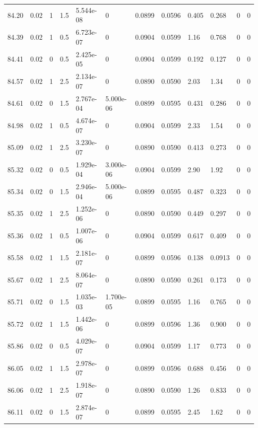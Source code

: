 \documentclass[preview]{standalone}
\begin{document}
{{{{{{{{{{{{{{{{{\begin{tabular}{L{1.2cm}C{1.2cm} C{0.3cm}C{0.5cm} C{1.4cm}C{1.4cm} C{1.4cm}C{1.4cm} C{1.6cm}C{1.6cm} C{1.6cm}C{1.6cm}}
  84.20  &  0.02  & 1     & 1.5 &  5.544e-08  & 0  &  0.0899&   0.0596& 0.405 & 0.268   &  0 & 0  \\ 
  84.39  &  0.02  & 1     & 0.5 &  6.723e-07  & 0  &  0.0904&   0.0599& 1.16 & 0.768   &  0 & 0  \\ 
  84.41  &  0.02  & 0     & 0.5 &  2.425e-05  & 0  &  0.0904&   0.0599& 0.192 & 0.127   &  0 & 0  \\ 
  84.57  &  0.02  & 1     & 2.5 &  2.134e-07  & 0  &  0.0890&   0.0590& 2.03 & 1.34   &  0 & 0  \\ 
  84.61  &  0.02  & 0     & 1.5 &  2.767e-04  & 5.000e-06  &  0.0899&   0.0595& 0.431 & 0.286   &  0 & 0  \\ 
  84.98  &  0.02  & 1     & 0.5 &  4.674e-07  & 0  &  0.0904&   0.0599& 2.33 & 1.54   &  0 & 0  \\ 
  85.09  &  0.02  & 1     & 2.5 &  3.230e-07  & 0  &  0.0890&   0.0590& 0.413 & 0.273   &  0 & 0  \\ 
  85.32  &  0.02  & 0     & 0.5 &  1.929e-04  & 3.000e-06  &  0.0904&   0.0599& 2.90 & 1.92   &  0 & 0  \\ 
  85.34  &  0.02  & 0     & 1.5 &  2.946e-04  & 5.000e-06  &  0.0899&   0.0595& 0.487 & 0.323   &  0 & 0  \\ 
  85.35  &  0.02  & 1     & 2.5 &  1.252e-06  & 0  &  0.0890&   0.0590& 0.449 & 0.297   &  0 & 0  \\ 
  85.36  &  0.02  & 1     & 0.5 &  1.007e-06  & 0  &  0.0904&   0.0599& 0.617 & 0.409   &  0 & 0  \\ 
  85.58  &  0.02  & 1     & 1.5 &  2.181e-07  & 0  &  0.0899&   0.0596& 0.138 & 0.0913   &  0 & 0  \\ 
  85.67  &  0.02  & 1     & 2.5 &  8.064e-07  & 0  &  0.0890&   0.0590& 0.261 & 0.173   &  0 & 0  \\ 
  85.71  &  0.02  & 0     & 1.5 &  1.035e-03  & 1.700e-05  &  0.0899&   0.0595& 1.16 & 0.765   &  0 & 0  \\ 
  85.72  &  0.02  & 1     & 1.5 &  1.442e-06  & 0  &  0.0899&   0.0596& 1.36 & 0.900   &  0 & 0  \\ 
  85.86  &  0.02  & 0     & 0.5 &  4.029e-07  & 0  &  0.0904&   0.0599& 1.17 & 0.773   &  0 & 0  \\ 
  86.05  &  0.02  & 1     & 1.5 &  2.978e-07  & 0  &  0.0899&   0.0596& 0.688 & 0.456   &  0 & 0  \\ 
  86.06  &  0.02  & 1     & 2.5 &  1.918e-07  & 0  &  0.0890&   0.0590& 1.26 & 0.833   &  0 & 0  \\ 
  86.11  &  0.02  & 0     & 1.5 &  2.874e-07  & 0  &  0.0899&   0.0595& 2.45 & 1.62   &  0 & 0  \\ 

\end{tabular}}}}}}}}}}}}}}}}}}
\end{document}
